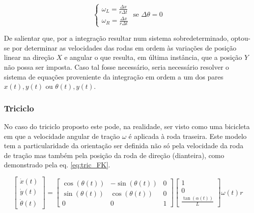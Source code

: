 \documentclass{article}
\begin{document}
\begin{equation}
    \begin{cases}
        \omega_{L} = \frac{\Delta x}{r \Delta t} \\
        \omega_{R} = \frac{\Delta x}{r \Delta t}
    \end{cases}
    \text{ se } \Delta \theta = 0
    \label{eq:diff_drive_ik_lin}
\end{equation}

De salientar que, por a integração resultar num sistema sobredeterminado, optou-se por determinar as velocidades das rodas em ordem às variações de posição linear na direção $X$ e angular o que resulta, em última instância, que a posição $Y$ não possa ser imposta. Caso tal fosse necessário, seria necessário resolver o sistema de equações proveniente da integração em ordem a um dos pares $x(t), y(t)$ ou $\theta (t), y(t)$.


\subsubsection{Triciclo}

No caso do triciclo proposto este pode, na realidade, ser visto como uma bicicleta em que a velocidade angular de tração $\omega$ é aplicada à roda traseira. Este modelo tem a particularidade da orientação ser definida não só pela velocidade da roda de tração mas também pela posição da roda de direção (dianteira), como demonstrado pela eq. \ref{eq:tric_FK}.

\begin{equation}
    \begin{bmatrix}
        \dot{x}(t) \\
        \dot{y}(t) \\
        \dot{\theta}(t) 
    \end{bmatrix} = 
    \begin{bmatrix}
        \cos(\theta(t)) & -\sin(\theta(t)) & 0 \\
        \sin(\theta(t)) & \cos(\theta(t)) & 0 \\
        0 & 0 & 1
    \end{bmatrix}
    \begin{bmatrix}
        1 \\
        0 \\
        \frac{\tan(\alpha(t))}{L}
    \end{bmatrix} \omega(t) r
    \label{eq:tric_FK}
\end{equation}
\end{document}

